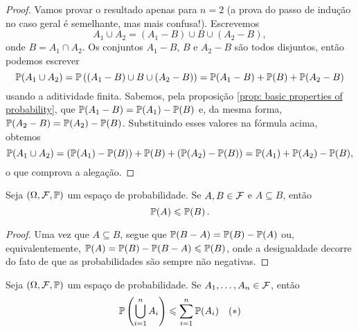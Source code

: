 \begin{proof}
Vamos provar o resultado apenas para $n=2$ (a prova do passo de indução no caso geral é semelhante, mas mais confusa!). Escrevemos
\[
A_1 \cup A_2 = (A_1-B) \cup B \cup (A_2-B),
\]
onde $B=A_1 \cap A_2$. Os conjuntos $A_1-B$, $B$ e $A_2-B$ são todos disjuntos, então podemos escrever
\[
\mathbb{P}(A_1 \cup A_2) = \mathbb{P}\left( (A_1-B) \cup B \cup (A_2-B) \right) = \mathbb{P}(A_1-B) + \mathbb{P}(B) + \mathbb{P}(A_2-B)
\]
usando a aditividade finita. Sabemos, pela proposição \ref{prop: basic properties of probability}, que $\mathbb{P}(A_1-B) = \mathbb{P}(A_1) - \mathbb{P}(B)$ e, da mesma forma, $\mathbb{P}(A_2-B) = \mathbb{P}(A_2) - \mathbb{P}(B)$. Substituindo esses valores na fórmula acima, obtemos
\[
\mathbb{P}(A_1 \cup A_2) = (\mathbb{P}(A_1) - \mathbb{P}(B)) + \mathbb{P}(B) + (\mathbb{P}(A_2) - \mathbb{P}(B)) = \mathbb{P}(A_1) + \mathbb{P}(A_2) - \mathbb{P}(B),
\]
o que comprova a alegação.
\end{proof}

\begin{proposition} \label{prop_prob}
Seja $(\Omega, \mathcal F, \mathbb{P})$ um espaço de probabilidade. Se $A, B \in \mathcal F$ e $A \subseteq B$, então
\begin{equation}
\mathbb{P}(A) \leqslant \mathbb{P}(B) \,.
\end{equation}
\end{proposition}

\begin{proof}  
Uma vez que $A \subseteq B$, segue que $\mathbb{P}(B-A) = \mathbb{P}(B) - \mathbb{P}(A)$ ou, equivalentemente, $\mathbb{P}(A) = \mathbb{P}(B) - \mathbb{P}(B-A) \leqslant \mathbb{P}(B)$, onde a desigualdade decorre do fato de que as probabilidades são sempre não negativas.
\end{proof}

\begin{proposition}
Seja $(\Omega, \mathcal F, \mathbb{P})$ um espaço de probabilidade. Se $A_1, \dots, A_n \in \mathcal F$, então 
\begin{equation}
\mathbb{P}\left( \bigcup_{i=1}^{n} A_i \right) \leqslant \sum_{i=1}^{n} \mathbb{P}(A_i) \quad {\rm (*)}
\end{equation}
\end{proposition}

